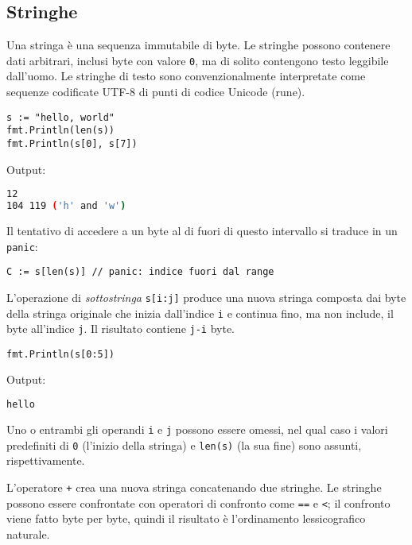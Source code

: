 \documentclass[../../thesis.tex]{subfiles}
\begin{document}
    \subsection{Stringhe}\label{subsec:stringhe}
    Una stringa è una sequenza immutabile di byte.
    Le stringhe possono contenere dati arbitrari, inclusi byte con valore \verb"0", ma di solito contengono testo leggibile dall'uomo.
    Le stringhe di testo sono convenzionalmente interpretate come sequenze codificate UTF-8 di punti di codice Unicode (rune).
    \begin{lstlisting}[frame = single, label = {lst:lstlisting2.1}]
s := "hello, world"
fmt.Println(len(s))
fmt.Println(s[0], s[7])
    \end{lstlisting}
    Output:
    \begin{lstlisting}[language = bash, frame = L, label = {lst:lstlisting2.2}]
12
104 119 ('h' and 'w')
    \end{lstlisting}
    Il tentativo di accedere a un byte al di fuori di questo intervallo si traduce in un \verb"panic":
    \begin{lstlisting}[frame = single, label = {lst:lstlisting2.3}]
C := s[len(s)] // panic: indice fuori dal range
    \end{lstlisting}
    L'operazione di \textit{sottostringa} \verb"s[i:j]" produce una nuova stringa composta dai byte della stringa originale che inizia dall'indice \verb"i" e continua fino, ma non include, il byte all'indice \verb"j".
    Il risultato contiene \verb"j-i" byte.
    \begin{lstlisting}[frame = single, label = {lst:lstlisting2.4}]
fmt.Println(s[0:5])
    \end{lstlisting}
    Output:
    \begin{lstlisting}[language = bash, frame = L, label = {lst:lstlisting2-2.5}]
hello
    \end{lstlisting}
    Uno o entrambi gli operandi \verb"i" e \verb"j" possono essere omessi, nel qual caso i valori predefiniti di \verb"0" (l'inizio della stringa) e \verb"len(s)" (la sua fine) sono assunti, rispettivamente.
    \hfill \vspace{12pt}

    L'operatore \verb"+" crea una nuova stringa concatenando due stringhe.
    Le stringhe possono essere confrontate con operatori di confronto come \verb"==" e \verb"<"; il confronto viene fatto byte per byte, quindi il risultato è l'ordinamento lessicografico naturale.
    \hfill \vspace{12pt}
\end{document}
